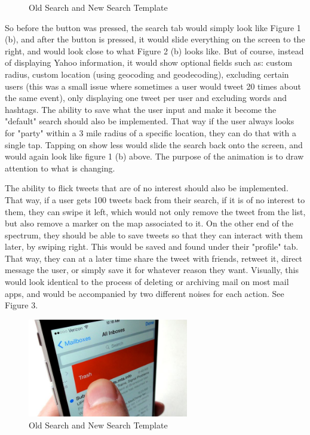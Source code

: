 \documentclass[11pt]{article}
\begin{document}
\begin{figure}[H]
    \caption{Old Search and New Search Template}
    \label{fig:example}
\end{figure}

So before the button was pressed, the search tab would simply look like Figure 1 (b), and after the button is pressed, it would slide everything on the screen to the right, and would look close to what Figure 2 (b) looks like. But of course, instead of displaying Yahoo information, it would show optional fields such as: custom radius, custom location (using geocoding and geodecoding), excluding certain users (this was a small issue where sometimes a user would tweet 20 times about the same event), only displaying one tweet per user and excluding words and hashtags. The ability to save what the user input and make it become the "default" search should also be implemented. That way if the user always looks for "party" within a 3 mile radius of a specific location, they can do that with a single tap. Tapping on show less would slide the search back onto the screen, and would again look like figure 1 (b) above. The purpose of the animation is to draw attention to what is changing. 

The ability to flick tweets that are of no interest should also be implemented. That way, if a user gets 100 tweets back from their search, if it is of no interest to them, they can swipe it left, which would not only remove the tweet from the list, but also remove a marker on the map associated to it. On the other end of the spectrum, they should be able to save tweets so that they can interact with them later, by swiping right. This would be saved and found under their "profile" tab. That way, they can at a later time share the tweet with friends, retweet it, direct message the user, or simply save it for whatever reason they want. Visually, this would look identical to the process of deleting or archiving mail on most mail apps, and would be accompanied by two different noises for each action. See Figure 3.

\begin{figure}[H]
    \centering
    \includegraphics[width=7cm]{swipeDelete}
    \caption{Old Search and New Search Template}
    \label{fig:example}
\end{figure}
\end{document}
